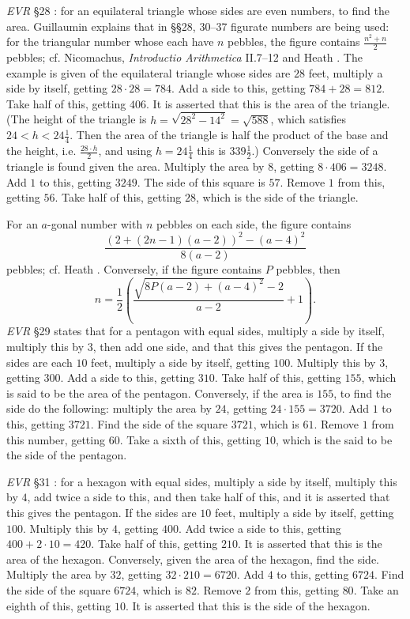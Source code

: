 \documentclass{amsart}
\theoremstyle{definition}
\begin{document}
{\em EVR} \S 28 \cite[pp.~158--163]{guillaumin}: for an equilateral triangle whose sides are even numbers,
to find the area. Guillaumin explains that in \S \S 28, 30--37 
figurate numbers are being used:
for the triangular number whose each have $n$ pebbles, the figure contains $\frac{n^2+n}{2}$ pebbles; cf.
Nicomachus, {\em Introductio Arithmetica} II.7--12 \cite[pp~239--249]{nicomachus} and Heath \cite[p.~76]{HGMI}. 
The example is given of the equilateral triangle whose sides are $28$ feet, 
multiply a side by itself, getting $28\cdot 28=784$. Add a side to this, getting $784+28=812$. Take half of this, getting $406$. It is asserted that this
is the area of the triangle. (The height of the triangle is $h=\sqrt{28^2-14^2}=\sqrt{588}$, which satisfies $24<h<24 \frac{1}{4}$. 
Then the area of the triangle is half the product of the base and the height, i.e. $\frac{28\cdot h}{2}$, and using $h=24 \frac{1}{4}$ this is
$339 \frac{1}{2}$.)
Conversely the side of a triangle is found given the area.
Multiply the area by $8$, getting $8\cdot 406 = 3248$. Add $1$ to this, getting $3249$. The side of this square is 
$57$. Remove $1$ from this, getting $56$. Take half of this, getting $28$, which is the side of the triangle. 

For an $a$-gonal number with $n$ pebbles on each side, the figure contains 
\[
\frac{(2+(2n-1)(a-2))^2-(a-4)^2}{8(a-2)}
\]
pebbles; cf. Heath \cite[p.~516]{HGMII}.
Conversely, if the figure contains $P$ pebbles, then
\[
n=\frac{1}{2}\left( \frac{\sqrt{8P(a-2)+(a-4)^2}-2}{a-2}+1\right).
\]
{\em EVR} \S 29 \cite[pp.~164--167]{guillaumin} states that for a pentagon with equal sides, multiply a side by itself,
multiply this by $3$, then add one side, and that this gives the pentagon. If the sides are each $10$ feet, multiply
a side by itself, getting $100$. Multiply this by $3$, getting $300$. Add a side to this, getting $310$. Take
half of this, getting $155$, which is said to be the area of the pentagon. 
Conversely, if the area is $155$, to find the side do the following: multiply the area by $24$, getting
$24 \cdot 155 = 3720$. Add $1$ to this, getting $3721$. Find the side of the square $3721$, which is $61$. 
Remove $1$ from this number, getting $60$. Take a sixth of this, getting $10$, which is the said to be the side of the
pentagon.

{\em EVR} \S 31 \cite[pp.~172--177]{guillaumin}: for a hexagon with equal sides, multiply
a side by itself, multiply this by $4$, add twice a side to this, and then take half of this, and it is asserted
that this gives the pentagon. If the sides are $10$ feet, multiply a side by itself, getting $100$. 
Multiply this by $4$, getting $400$. Add twice a side to this, getting $400+2\cdot 10=420$. Take half
of this, getting $210$. It is asserted that this is the area of the hexagon. Conversely,
given the area of the hexagon, find the side. Multiply the area by $32$, getting $32 \cdot 210 = 6720$.
Add $4$ to this, getting $6724$. Find the side of the square $6724$, which is $82$. Remove $2$ from this,
getting $80$. Take an eighth of this, getting $10$. It is asserted that this is the side of the hexagon.
\end{document}
